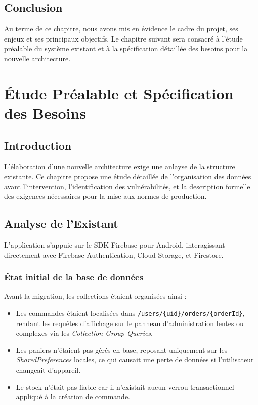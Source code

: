 \documentclass[12pt,a4paper]{report}
\begin{document}
\section{Conclusion}
Au terme de ce chapitre, nous avons mis en évidence le cadre du projet, ses enjeux et ses principaux objectifs. Le chapitre suivant sera consacré à l'étude préalable du système existant et à la spécification détaillée des besoins pour la nouvelle architecture.

\chapter{Étude Préalable et Spécification des Besoins}

\section{Introduction}
L'élaboration d'une nouvelle architecture exige une anlayse de la structure existante. Ce chapitre propose une étude détaillée de l'organisation des données avant l'intervention, l'identification des vulnérabilités, et la description formelle des exigences nécessaires pour la mise aux normes de production.

\section{Analyse de l'Existant}
L'application s'appuie sur le SDK Firebase pour Android, interagissant directement avec Firebase Authentication, Cloud Storage, et Firestore.

\subsection{État initial de la base de données}
Avant la migration, les collections étaient organisées ainsi :
\begin{itemize}
    \item Les commandes étaient localisées dans \texttt{/users/\{uid\}/orders/\{orderId\}}, rendant les requêtes d'affichage sur le panneau d'administration lentes ou complexes via les \textit{Collection Group Queries}.
    \item Les paniers n'étaient pas gérés en base, reposant uniquement sur les \textit{SharedPreferences} locales, ce qui causait une perte de données si l'utilisateur changeait d'appareil.
    \item Le stock n'était pas fiable car il n'existait aucun verrou transactionnel appliqué à la création de commande.
\end{itemize}
\end{document}
